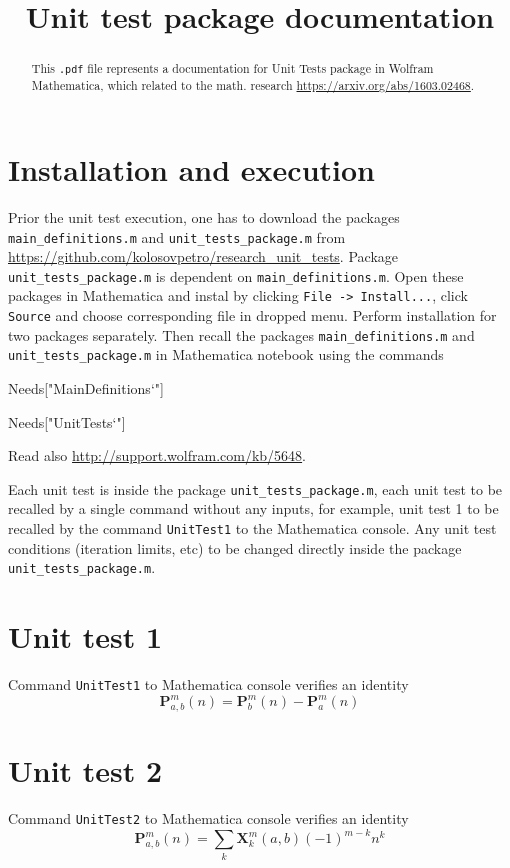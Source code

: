 \documentclass[12pt, letterpaper]{amsart}
\title{Unit test package documentation}
\theoremstyle{definition}
\theoremstyle{remark}
\numberwithin{equation}{section}
\begin{document}
\begin{abstract}
This \verb".pdf" file represents a documentation for Unit Tests package in Wolfram Mathematica, which related to the math. research
\href{https://arxiv.org/abs/1603.02468}{\textsf{https://arxiv.org/abs/1603.02468}}.
\end{abstract}
\maketitle
\tableofcontents
\section*{Installation and execution}
Prior the unit test execution, one has to download the packages \verb"main_definitions.m" and \verb"unit_tests_package.m" from \href{https://github.com/KolosovPetro/research_unit_tests}{\textsf{https://github.com/kolosovpetro/research\_unit\_tests}}. Package \verb"unit_tests_package.m" is dependent on \verb"main_definitions.m". Open these packages in Mathematica and instal by clicking \verb"File -> Install...", click \verb"Source" and choose corresponding file in dropped menu. Perform installation for two packages separately. Then recall the packages \verb"main_definitions.m" and \verb"unit_tests_package.m" in Mathematica notebook using the commands
\begin{center}
\textsf{Needs["MainDefinitions`"]}
\end{center}
\begin{center}
\textsf{Needs["UnitTests`"]}
\end{center}
Read also \href{http://support.wolfram.com/kb/5648}{\textsf{http://support.wolfram.com/kb/5648}}.

Each unit test is inside the package \verb"unit_tests_package.m", each unit test to be recalled by a single command without any inputs, for example, unit test 1 to be recalled by the command \verb"UnitTest1" to the Mathematica console. Any unit test conditions (iteration limits, etc) to be changed directly inside the package  \verb"unit_tests_package.m".
\section*{Unit test 1}
Command \verb"UnitTest1" to Mathematica console verifies an identity
\begin{equation*}
\mathbf{P}^{m}_{a,b}(n) = \mathbf{P}^{m}_{b}(n)-\mathbf{P}^{m}_{a}(n)
\end{equation*}
\section*{Unit test 2}
Command \verb"UnitTest2" to Mathematica console verifies an identity
\begin{equation*}
\mathbf{P}^{m}_{a,b}(n) = \sum_{k}\mathbf{X}^{m}_{k}(a,b) (-1)^{m-k} n^k
\end{equation*}
\end{document}
